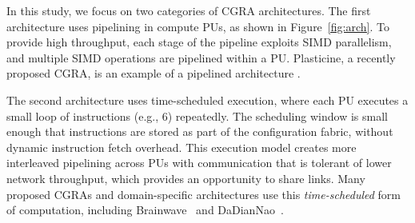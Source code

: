 In this study, we focus on two categories of CGRA architectures.
The first architecture uses pipelining in compute PUs, as shown in Figure~\ref{fig:arch}.
To provide high throughput, each stage of the pipeline exploits SIMD parallelism, and multiple SIMD operations are pipelined within a PU.
Plasticine, a recently proposed CGRA, is an example of a pipelined architecture \cite{plasticine}.

The second architecture uses time-scheduled execution, where each PU executes a small loop of instructions (e.g., 6) repeatedly. 
The scheduling window is small enough that instructions are stored as part of the configuration fabric, without dynamic instruction fetch overhead. 
This execution model creates more interleaved pipelining across PUs with communication that is tolerant of lower network throughput, which provides an opportunity to share links.
Many proposed CGRAs and domain-specific architectures use this \emph{time-scheduled} form of computation, including Brainwave~\cite{brainwave} and DaDianNao~\cite{dadiannao}.

